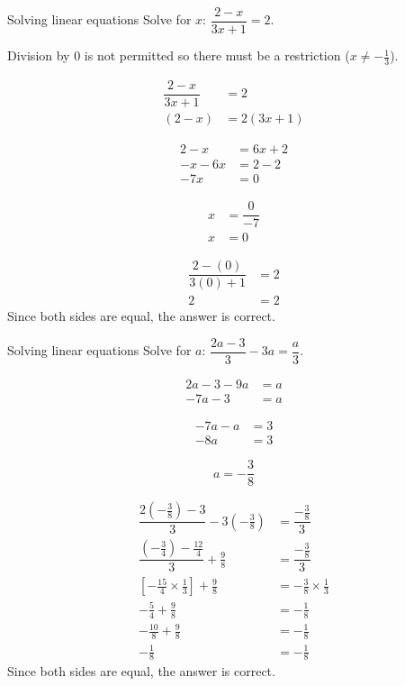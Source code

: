 \begin{wex}{Solving linear equations }
{Solve for $x$: $\dfrac{2-x}{3x+1}=2$.} 
{
Division by $0$ is not permitted so there must be a restriction ($x\neq -\frac{1}{3}$).

\begin{align*}
  \dfrac{2-x}{3x+1} &= 2 \\
  (2-x) &= 2(3x+1)
\end{align*}

\begin{align*}
  2-x &= 6x+2 \\
  -x-6x &= 2-2 \\
  -7x &= 0
\end{align*}

\begin{align*}
  x &= \dfrac{0}{-7} \\
  x &= 0
\end{align*}

\begin{align*}
  \dfrac{2-(0)}{3(0)+1} &= 2 \\
  2 &= 2
\end{align*}
Since both sides are equal, the answer is correct.
}
\end{wex}


\begin{wex}
{Solving linear equations}
{Solve for $a$: $\dfrac{2a-3}{3}-3a=\dfrac{a}{3}$.}
{
\begin{align*}
  2a-3 - 9a &= a \\
  -7a - 3 &= a
\end{align*}

\begin{align*}
  -7a -a &= 3 \\
  -8a &= 3
\end{align*}

\begin{equation*}
  a = -\dfrac{3}{8}
\end{equation*}

\begin{align*}
  \dfrac{2(-\frac{3}{8}) - 3}{3} - 3(-\frac{3}{8}) &= \dfrac{-\frac{3}{8}}{3} \\
  \dfrac{(-\frac{3}{4}) - \frac{12}{4}}{3} + \frac{9}{8} &= \dfrac{-\frac{3}{8}}{3} \\ 
  \left[-\frac{15}{4} \times \frac{1}{3}\right] + \frac{9}{8} &= -\frac{3}{8} \times \frac{1}{3} \\ 
  -\frac{5}{4} + \frac{9}{8} &= -\frac{1}{8} \\ 
  -\frac{10}{8} + \frac{9}{8} &= -\frac{1}{8} \\ 
  -\frac{1}{8} &= -\frac{1}{8}
\end{align*}
Since both sides are equal, the answer is correct. 
}
\end{wex}

